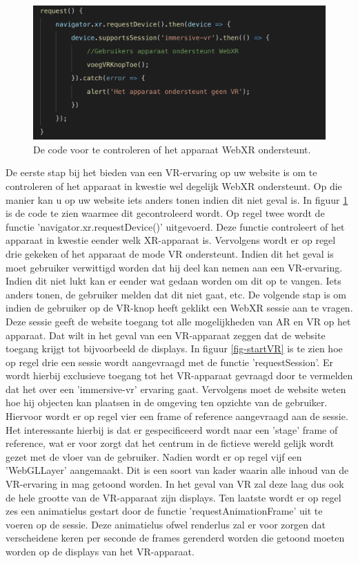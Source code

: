 \begin{figure}
	\includegraphics[width=\linewidth]{img/requestVR.png}
	\caption{De code voor te controleren of het apparaat WebXR ondersteunt.}
	\label{fig-requestVR}
\end{figure}

De eerste stap bij het bieden van een VR-ervaring op uw website is om te controleren of het apparaat in kwestie wel degelijk WebXR ondersteunt. Op die manier kan u op uw website iets anders tonen indien dit niet geval is. 
In figuur \ref{fig-requestVR} is de code te zien waarmee dit gecontroleerd wordt. Op regel twee wordt de functie 'navigator.xr.requestDevice()' uitgevoerd. Deze functie controleert of het apparaat in kwestie eender welk XR-apparaat is. Vervolgens wordt er op regel drie gekeken of het apparaat de mode VR ondersteunt. Indien dit het geval is moet gebruiker verwittigd worden dat hij deel kan nemen aan een VR-ervaring. Indien dit niet lukt kan er eender wat gedaan worden om dit op te vangen. Iets anders tonen, de gebruiker melden dat dit niet gaat, etc. 
De volgende stap is om indien de gebruiker op de VR-knop heeft geklikt een WebXR sessie aan te vragen. Deze sessie geeft de website toegang tot alle mogelijkheden van AR en VR op het apparaat. Dat wilt in het geval van een VR-apparaat zeggen dat de website toegang krijgt tot bijvoorbeeld de displays. In figuur \ref{fig-startVR} is te zien hoe op regel drie een sessie wordt aangevraagd met de functie 'requestSession'. Er wordt hierbij exclusieve toegang tot het VR-apparaat gevraagd door te vermelden dat het over een 'immersive-vr' ervaring gaat. Vervolgens moet de website weten hoe hij objecten kan plaatsen in de omgeving ten opzichte van de gebruiker. Hiervoor wordt er op regel vier een frame of reference aangevraagd aan de sessie. Het interessante hierbij is dat er gespecificeerd wordt naar een 'stage' frame of reference, wat er voor zorgt dat het centrum in de fictieve wereld gelijk wordt gezet met de vloer van de gebruiker. Nadien wordt er op regel vijf een 'WebGLLayer' aangemaakt. Dit is een soort van kader waarin alle inhoud van de VR-ervaring in mag getoond worden. In het geval van VR zal deze laag dus ook de hele grootte van de VR-apparaat zijn displays. Ten laatste wordt er op regel zes een animatielus gestart door de functie 'requestAnimationFrame' uit te voeren op de sessie. Deze animatielus ofwel renderlus zal er voor zorgen dat verscheidene keren per seconde de frames gerenderd worden die getoond moeten worden op de displays van het VR-apparaat.

